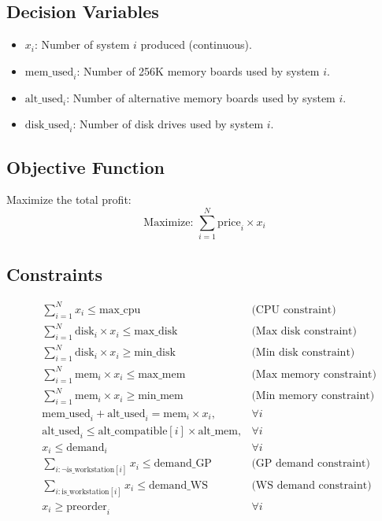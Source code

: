 \documentclass{article}
\begin{document}
\subsection*{Decision Variables}
\begin{itemize}
    \item \( x_i \): Number of system \( i \) produced (continuous).
    \item \( \text{mem\_used}_i \): Number of 256K memory boards used by system \( i \).
    \item \( \text{alt\_used}_i \): Number of alternative memory boards used by system \( i \).
    \item \( \text{disk\_used}_i \): Number of disk drives used by system \( i \).
\end{itemize}

\subsection*{Objective Function}
Maximize the total profit:
\[
\text{Maximize: } \sum_{i=1}^{N} \text{price}_i \times x_i
\]

\subsection*{Constraints}
\begin{align}
    & \sum_{i=1}^{N} x_i \leq \text{max\_cpu} & \text{(CPU constraint)} \\
    & \sum_{i=1}^{N} \text{disk}_i \times x_i \leq \text{max\_disk} & \text{(Max disk constraint)} \\
    & \sum_{i=1}^{N} \text{disk}_i \times x_i \geq \text{min\_disk} & \text{(Min disk constraint)} \\
    & \sum_{i=1}^{N} \text{mem}_i \times x_i \leq \text{max\_mem} & \text{(Max memory constraint)} \\
    & \sum_{i=1}^{N} \text{mem}_i \times x_i \geq \text{min\_mem} & \text{(Min memory constraint)} \\
    & \text{mem\_used}_i + \text{alt\_used}_i = \text{mem}_i \times x_i, & \forall i \\
    & \text{alt\_used}_i \leq \text{alt\_compatible}[i] \times \text{alt\_mem}, & \forall i \\
    & x_i \leq \text{demand}_i & \forall i \\
    & \sum_{i: \neg \text{is\_workstation}[i]} x_i \leq \text{demand\_GP} & \text{(GP demand constraint)} \\
    & \sum_{i: \text{is\_workstation}[i]} x_i \leq \text{demand\_WS} & \text{(WS demand constraint)} \\
    & x_i \geq \text{preorder}_i & \forall i
\end{align}
\end{document}
